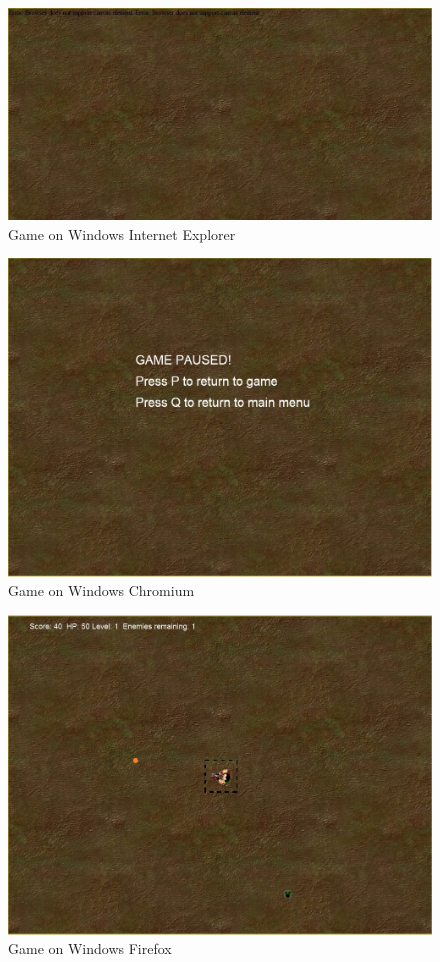 \documentclass{article}
\begin{document}
\begin{figure}[p]
\centering
\includegraphics[scale=0.5]{winIE.jpg}
\caption{Game on Windows Internet Explorer}
\label{fig:Game_On_IE}
\end{figure}

\begin{figure}[p]
\centering
\includegraphics[scale=0.5]{winC.jpg}
\caption{Game on Windows Chromium}
\label{fig:Game_On_Chromium}
\end{figure}

\begin{figure}[p]
\centering
\includegraphics[scale=0.5]{winF.jpg}
\caption{Game on Windows Firefox}
\label{fig:Game_On_Firefox}
\end{figure}
\end{document}
